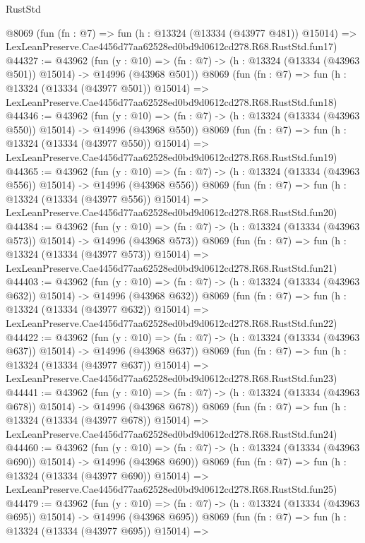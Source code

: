 \begin{lexlean}{RustStd}
\begin{coremodule}
    @8069
    (fun (fn : @7) =>
    fun (h : @13324 (@13334 (@43977 @481)) @15014) =>
    LexLeanPreserve.Cae4456d77aa62528ed0bd9d0612cd278.R68.RustStd.fun17)
@44327 := @43962
    (fun (y : @10) =>
    (fn : @7) -> (h : @13324 (@13334 (@43963 @501)) @15014) -> @14996 (@43968 @501))
    @8069
    (fun (fn : @7) =>
    fun (h : @13324 (@13334 (@43977 @501)) @15014) =>
    LexLeanPreserve.Cae4456d77aa62528ed0bd9d0612cd278.R68.RustStd.fun18)
@44346 := @43962
    (fun (y : @10) =>
    (fn : @7) -> (h : @13324 (@13334 (@43963 @550)) @15014) -> @14996 (@43968 @550))
    @8069
    (fun (fn : @7) =>
    fun (h : @13324 (@13334 (@43977 @550)) @15014) =>
    LexLeanPreserve.Cae4456d77aa62528ed0bd9d0612cd278.R68.RustStd.fun19)
@44365 := @43962
    (fun (y : @10) =>
    (fn : @7) -> (h : @13324 (@13334 (@43963 @556)) @15014) -> @14996 (@43968 @556))
    @8069
    (fun (fn : @7) =>
    fun (h : @13324 (@13334 (@43977 @556)) @15014) =>
    LexLeanPreserve.Cae4456d77aa62528ed0bd9d0612cd278.R68.RustStd.fun20)
@44384 := @43962
    (fun (y : @10) =>
    (fn : @7) -> (h : @13324 (@13334 (@43963 @573)) @15014) -> @14996 (@43968 @573))
    @8069
    (fun (fn : @7) =>
    fun (h : @13324 (@13334 (@43977 @573)) @15014) =>
    LexLeanPreserve.Cae4456d77aa62528ed0bd9d0612cd278.R68.RustStd.fun21)
@44403 := @43962
    (fun (y : @10) =>
    (fn : @7) -> (h : @13324 (@13334 (@43963 @632)) @15014) -> @14996 (@43968 @632))
    @8069
    (fun (fn : @7) =>
    fun (h : @13324 (@13334 (@43977 @632)) @15014) =>
    LexLeanPreserve.Cae4456d77aa62528ed0bd9d0612cd278.R68.RustStd.fun22)
@44422 := @43962
    (fun (y : @10) =>
    (fn : @7) -> (h : @13324 (@13334 (@43963 @637)) @15014) -> @14996 (@43968 @637))
    @8069
    (fun (fn : @7) =>
    fun (h : @13324 (@13334 (@43977 @637)) @15014) =>
    LexLeanPreserve.Cae4456d77aa62528ed0bd9d0612cd278.R68.RustStd.fun23)
@44441 := @43962
    (fun (y : @10) =>
    (fn : @7) -> (h : @13324 (@13334 (@43963 @678)) @15014) -> @14996 (@43968 @678))
    @8069
    (fun (fn : @7) =>
    fun (h : @13324 (@13334 (@43977 @678)) @15014) =>
    LexLeanPreserve.Cae4456d77aa62528ed0bd9d0612cd278.R68.RustStd.fun24)
@44460 := @43962
    (fun (y : @10) =>
    (fn : @7) -> (h : @13324 (@13334 (@43963 @690)) @15014) -> @14996 (@43968 @690))
    @8069
    (fun (fn : @7) =>
    fun (h : @13324 (@13334 (@43977 @690)) @15014) =>
    LexLeanPreserve.Cae4456d77aa62528ed0bd9d0612cd278.R68.RustStd.fun25)
@44479 := @43962
    (fun (y : @10) =>
    (fn : @7) -> (h : @13324 (@13334 (@43963 @695)) @15014) -> @14996 (@43968 @695))
    @8069
    (fun (fn : @7) =>
    fun (h : @13324 (@13334 (@43977 @695)) @15014) =>

\end{coremodule}
\end{lexlean}

